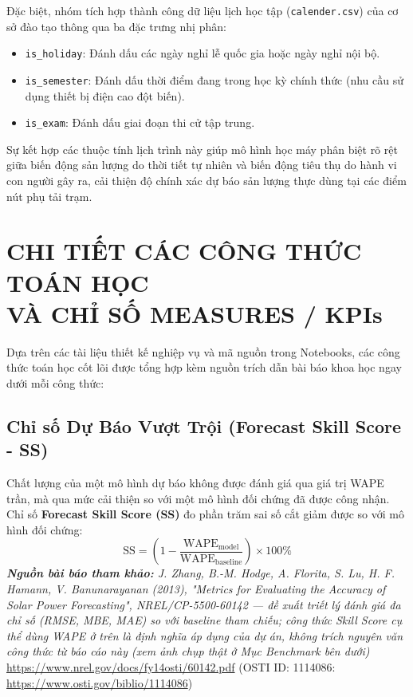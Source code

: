 \documentclass[12pt,a4paper]{article}
\begin{document}
Đặc biệt, nhóm tích hợp thành công dữ liệu lịch học tập (\texttt{calender.csv}) của cơ sở đào tạo thông qua ba đặc trưng nhị phân:
\begin{itemize}
    \item \texttt{is\_holiday}: Đánh dấu các ngày nghỉ lễ quốc gia hoặc ngày nghỉ nội bộ.
    \item \texttt{is\_semester}: Đánh dấu thời điểm đang trong học kỳ chính thức (nhu cầu sử dụng thiết bị điện cao đột biến).
    \item \texttt{is\_exam}: Đánh dấu giai đoạn thi cử tập trung.
\end{itemize}
Sự kết hợp các thuộc tính lịch trình này giúp mô hình học máy phân biệt rõ rệt giữa biến động sản lượng do thời tiết tự nhiên và biến động tiêu thụ do hành vi con người gây ra, cải thiện độ chính xác dự báo sản lượng thực dùng tại các điểm nút phụ tải trạm.


\section[CHI TIẾT CÁC CÔNG THỨC TOÁN HỌC VÀ KPIs]{CHI TIẾT CÁC CÔNG THỨC TOÁN HỌC\\VÀ CHỈ SỐ MEASURES / KPIs}

Dựa trên các tài liệu thiết kế nghiệp vụ và mã nguồn trong Notebooks, các công thức toán học cốt lõi được tổng hợp kèm nguồn trích dẫn bài báo khoa học ngay dưới mỗi công thức:

\subsection{Chỉ số Dự Báo Vượt Trội (Forecast Skill Score - SS)}
Chất lượng của một mô hình dự báo không được đánh giá qua giá trị WAPE trần, mà qua mức cải thiện so với một mô hình đối chứng đã được công nhận. Chỉ số \textbf{Forecast Skill Score (SS)} đo phần trăm sai số cắt giảm được so với mô hình đối chứng:
\begin{equation}
    \text{SS} = \left(1 - \frac{\text{WAPE}_{\text{model}}}{\text{WAPE}_{\text{baseline}}}\right) \times 100\%
\end{equation}
\textit{\textbf{Nguồn bài báo tham khảo:} J. Zhang, B.-M. Hodge, A. Florita, S. Lu, H. F. Hamann, V. Banunarayanan (2013), "Metrics for Evaluating the Accuracy of Solar Power Forecasting", NREL/CP-5500-60142 — đề xuất triết lý đánh giá đa chỉ số (RMSE, MBE, MAE) so với baseline tham chiếu; công thức Skill Score cụ thể dùng WAPE ở trên là định nghĩa áp dụng của dự án, không trích nguyên văn công thức từ báo cáo này (xem ảnh chụp thật ở Mục Benchmark bên dưới)}\\
\url{https://www.nrel.gov/docs/fy14osti/60142.pdf} (OSTI ID: 1114086: \url{https://www.osti.gov/biblio/1114086})
\end{document}
